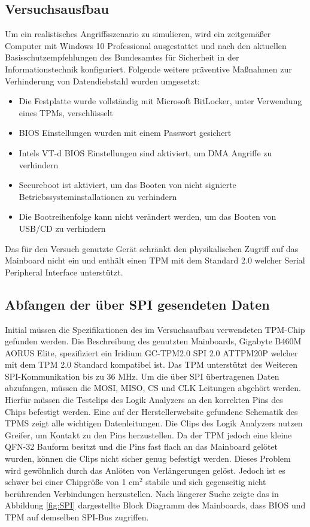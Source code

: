 \documentclass[conference]{IEEEtran}
\begin{document}
\subsection{Versuchsausfbau}
Um ein realistisches Angriffsszenario zu simulieren, wird ein zeitgemäßer Computer mit Windows 10 Professional ausgestattet und nach den aktuellen Basisschutzempfehlungen des Bundesamtes für Sicherheit in der Informationstechnik \cite{BundesamtfurSicherheitinderInformationstechnik.28092021} konfiguriert. Folgende weitere präventive Maßnahmen zur Verhinderung von Datendiebstahl wurden umgesetzt:

\begin{itemize}
	
	\item Die Festplatte wurde vollständig mit Microsoft BitLocker, unter Verwendung eines TPMs, verschlüsselt
	\item BIOS Einstellungen wurden mit einem Passwort gesichert
	\item Intels VT-d BIOS Einstellungen sind aktiviert, um DMA Angriffe zu verhindern
	\item Secureboot ist aktiviert, um das Booten von nicht signierte Betriebssysteminstallationen zu verhindern
	\item Die Bootreihenfolge kann nicht verändert werden, um das Booten von USB/CD zu verhindern
	
\end{itemize}
Das für den Versuch genutzte Gerät schränkt den physikalischen Zugriff auf das Mainboard nicht ein und enthält einen TPM mit dem Standard 2.0 welcher Serial Peripheral Interface unterstützt.

\subsection{Abfangen der über SPI gesendeten Daten}
Initial müssen die Spezifikationen des im Versuchsaufbau verwendeten TPM-Chip gefunden werden. Die Beschreibung des genutzten Mainboards, Gigabyte B460M AORUS Elite, spezifiziert ein Iridium GC-TPM2.0 SPI 2.0 ATTPM20P welcher mit dem TPM 2.0 Standard kompatibel ist. Das TPM unterstützt des Weiteren SPI-Kommunikation  bis zu 36 MHz.
Um die über SPI übertragenen Daten abzufangen, müssen die MOSI, MISO, CS und CLK Leitungen abgehört werden. Hierfür müssen die Testclips des Logik Analyzers an den korrekten Pins des Chips befestigt werden. Eine auf der Herstellerwebsite gefundene Schematik des TPMS zeigt alle wichtigen Datenleitungen.
Die Clips des Logik Analyzers nutzen Greifer, um Kontakt zu den Pins herzustellen. Da der TPM jedoch eine kleine QFN-32 Bauform besitzt und die Pins fast flach an das Mainboard gelötet wurden, können die Clips nicht sicher genug befestigt werden. Dieses Problem wird gewöhnlich durch das Anlöten von Verlängerungen gelöst. Jedoch ist es schwer bei einer Chipgröße von 1 cm$^{2}$ stabile und sich gegenseitig nicht berührenden Verbindungen herzustellen. 
Nach längerer Suche zeigte das in Abbildung \ref{fig:SPI} dargestellte Block Diagramm des Mainboards, dass BIOS und TPM auf demselben SPI-Bus zugriffen. 
\end{document}

